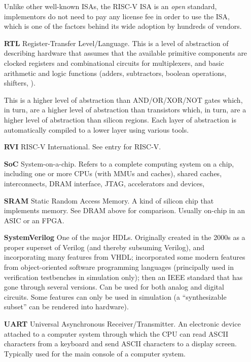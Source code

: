 \begin{itemize}
  Unlike other well-known ISAs, the RISC-V ISA is an \emph{open}
  standard, {\ie} implementors do not need to pay any license fee in
  order to use the ISA, which is one of the factors behind its wide
  adoption by hundreds of vendors.

\item[\bf RTL] Register-Transfer Level/Language.  This is a level of
  abstraction of describing hardware that assumes that the available
  primitive components are clocked registers and combinational
  circuits for multiplexers, and basic arithmetic and logic functions
  (adders, subtractors, boolean operations, shifters, {\etc}).

  This is a higher level of abstraction than AND/OR/XOR/NOT gates
  which, in turn, are a higher level of abstraction than transistors
  which, in turn, are a higher level of abstraction than silicon
  regions.  Each layer of abstraction is automatically compiled to a
  lower layer using various tools.

\item[\bf RVI] RISC-V International.  See entry for RISC-V.

\item[\bf SoC] System-on-a-chip.  Refers to a complete computing
  system on a chip, including one or more CPUs (with MMUs and caches),
  shared caches, interconnects, DRAM interface, JTAG, accelerators and
  devices, {\etc}

\item[\bf SRAM] Static Random Access Memory.  A kind of silicon chip
  that implements memory.  See DRAM above for comparison.  Usually
  on-chip in an ASIC or an FPGA.

\item[\bf SystemVerilog] One of the major HDLs.  Originally created in
  the 2000s as a proper superset of Verilog (and thereby subsuming
  Verilog), and incorporating many features from VHDL; incorporated
  some modern features from object-oriented software programming
  languages (principally used in verification testbenches in
  simulation only); then an IEEE standard that has gone through
  several versions.  Can be used for both analog and digital circuits.
  Some features can only be used in simulation (a ``synthesizable
  subset'' can be rendered into hardware).

\item[\bf UART] Universal Asynchronous Receiver/Transmitter.  An
  electronic device attached to a computer system through which the
  CPU can read ASCII characters from a keyboard and send ASCII
  characters to a display screen.  Typically used for the main console
  of a computer system.


\end{itemize}
